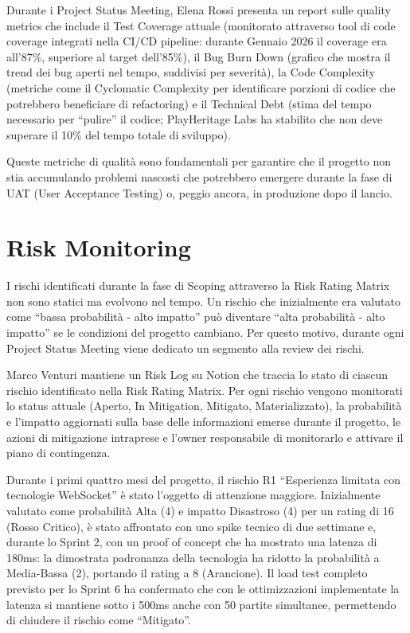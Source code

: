 Durante i Project Status Meeting, Elena Rossi presenta un report sulle quality metrics che include il Test Coverage attuale (monitorato attraverso tool di code coverage integrati nella CI/CD pipeline: durante Gennaio 2026 il coverage era all'87\%, superiore al target dell'85\%), il Bug Burn Down (grafico che mostra il trend dei bug aperti nel tempo, suddivisi per severità), la Code Complexity (metriche come il Cyclomatic Complexity per identificare porzioni di codice che potrebbero beneficiare di refactoring) e il Technical Debt (stima del tempo necessario per ``pulire'' il codice; PlayHeritage Labs ha stabilito che non deve superare il 10\% del tempo totale di sviluppo).

Queste metriche di qualità sono fondamentali per garantire che il progetto non stia accumulando problemi nascosti che potrebbero emergere durante la fase di UAT (User Acceptance Testing) o, peggio ancora, in produzione dopo il lancio.

\section{Risk Monitoring}

I rischi identificati durante la fase di Scoping attraverso la Risk Rating Matrix non sono statici ma evolvono nel tempo. Un rischio che inizialmente era valutato come ``bassa probabilità - alto impatto'' può diventare ``alta probabilità - alto impatto'' se le condizioni del progetto cambiano. Per questo motivo, durante ogni Project Status Meeting viene dedicato un segmento alla review dei rischi.

Marco Venturi mantiene un Risk Log su Notion che traccia lo stato di ciascun rischio identificato nella Risk Rating Matrix. Per ogni rischio vengono monitorati lo status attuale (Aperto, In Mitigation, Mitigato, Materializzato), la probabilità e l'impatto aggiornati sulla base delle informazioni emerse durante il progetto, le azioni di mitigazione intraprese e l'owner responsabile di monitorarlo e attivare il piano di contingenza.

Durante i primi quattro mesi del progetto, il rischio R1 ``Esperienza limitata con tecnologie WebSocket'' è stato l'oggetto di attenzione maggiore. Inizialmente valutato come probabilità Alta (4) e impatto Disastroso (4) per un rating di 16 (Rosso Critico), è stato affrontato con uno spike tecnico di due settimane e, durante lo Sprint 2, con un proof of concept che ha mostrato una latenza di 180ms: la dimostrata padronanza della tecnologia ha ridotto la probabilità a Media-Bassa (2), portando il rating a 8 (Arancione). Il load test completo previsto per lo Sprint 6 ha confermato che con le ottimizzazioni implementate la latenza si mantiene sotto i 500ms anche con 50 partite simultanee, permettendo di chiudere il rischio come ``Mitigato''.

